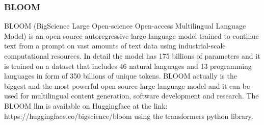 \subsubsection{BLOOM}
BLOOM (BigScience Large Open-science Open-access Multilingual Language Model) is an open source autoregressive large language model trained to continue text from a prompt on vast amounts of text data using industrial-scale computational resources. In detail the model has 175 billions of parameters and it is trained on a dataset that includes 46 natural languages and 13 programming languages in form of 350 billions of unique tokens.\cite{le2023bloom} BLOOM actually is the biggest and the most powerful open source large language model and it can be used for multilingual content generation, software development and research.\cite{exploring_bloom} The BLOOM llm is available on Huggingface at the link: https://huggingface.co/bigscience/bloom using the transformers python library.
